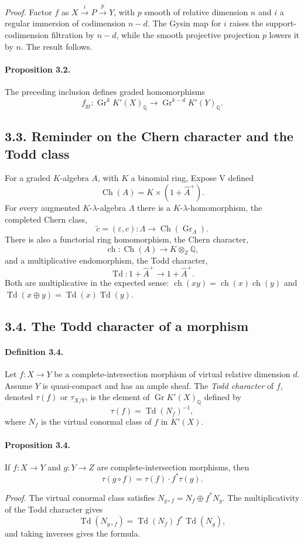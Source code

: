 \documentclass[12pt]{article}
\newcommand{\ZZ}{\mathbb Z}
\newcommand{\QQ}{\mathbb Q}
\newcommand{\Gr}{\operatorname{Gr}}
\newcommand{\Ch}{\operatorname{Ch}}
\newcommand{\Todd}{\operatorname{Td}}
\newcommand{\ch}{\operatorname{ch}}
\newcommand{\xto}[1]{\xrightarrow{#1}}
\begin{document}
\emph{Proof.} Factor $f$ as $X\xto{i}P\xto{p}Y$, with $p$ smooth of relative dimension $n$ and $i$ a regular immersion of codimension $n-d$. The Gysin map for $i$ raises the support-codimension filtration by $n-d$, while the smooth projective projection $p$ lowers it by $n$. The result follows.

\paragraph{Proposition 3.2.} The preceding inclusion defines graded homomorphisms
\[
f_{\mathrm{gr}}:\Gr^kK'(X)_\QQ\longrightarrow\Gr^{k-d}K'(Y)_\QQ.
\]

\subsection*{3.3. Reminder on the Chern character and the Todd class}

For a graded $K$-algebra $A$, with $K$ a binomial ring, Expose V defined
\[
\Ch(A)=K\times(1+\widehat A^+).
\]
For every augmented $K$-$\lambda$-algebra $\Lambda$ there is a $K$-$\lambda$-homomorphism, the completed Chern class,
\[
\widetilde c=(\varepsilon,c):\Lambda\longrightarrow\Ch(\Gr_\Lambda).
\]
There is also a functorial ring homomorphism, the Chern character,
\[
\ch:\Ch(A)\longrightarrow K\otimes_\ZZ\QQ,
\]
and a multiplicative endomorphism, the Todd character,
\[
\Todd:1+\widehat A^+\longrightarrow1+\widehat A^+.
\]
Both are multiplicative in the expected sense: $\ch(xy)=\ch(x)\ch(y)$ and $\Todd(x\oplus y)=\Todd(x)\Todd(y)$.

\subsection*{3.4. The Todd character of a morphism}

\paragraph{Definition 3.4.} Let $f:X\to Y$ be a complete-intersection morphism of virtual relative dimension $d$. Assume $Y$ is quasi-compact and has an ample sheaf. The \emph{Todd character} of $f$, denoted $\tau(f)$ or $\tau_{X/Y}$, is the element of $\Gr K'(X)_\QQ$ defined by
\[
\tau(f)=\Todd(N_f)^{-1},
\]
where $N_f$ is the virtual conormal class of $f$ in $K'(X)$.

\paragraph{Proposition 3.4.} If $f:X\to Y$ and $g:Y\to Z$ are complete-intersection morphisms, then
\[
\tau(g\circ f)=\tau(f)\cdot f^*\tau(g).
\]

\emph{Proof.} The virtual conormal class satisfies $N_{g\circ f}=N_f\oplus f^*N_g$. The multiplicativity of the Todd character gives
\[
\Todd(N_{g\circ f})=\Todd(N_f)\,f^*\Todd(N_g),
\]
and taking inverses gives the formula.
\end{document}
